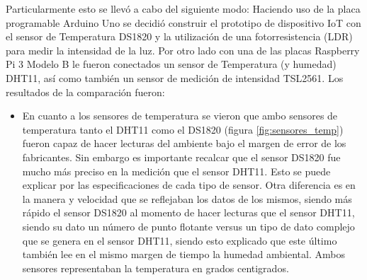 Particularmente esto se llevó a cabo del siguiente modo: Haciendo uso de la placa programable Arduino Uno se decidió construir el prototipo de dispositivo IoT con el sensor de Temperatura DS1820 y la utilización de una fotorresistencia (LDR) para medir la intensidad de la luz. Por otro lado con una de las placas Raspberry Pi 3 Modelo B le fueron conectados un sensor de Temperatura (y humedad) DHT11, así como también un sensor de medición de intensidad TSL2561. Los resultados de la comparación fueron: 
\begin{itemize}
\item En cuanto a los sensores de temperatura se vieron que ambo sensores de temperatura tanto el DHT11 como el DS1820 (figura \ref{fig:sensores_temp}) fueron capaz de hacer lecturas del ambiente bajo el margen de error de los fabricantes. Sin embargo es importante recalcar que el sensor DS1820 fue mucho más preciso en la medición que el sensor DHT11. Esto se puede explicar por las especificaciones de cada tipo de sensor. Otra diferencia es en la manera y velocidad que se reflejaban los datos de los mismos, siendo más rápido el sensor DS1820 al momento de hacer lecturas que el sensor DHT11, siendo su dato un número de punto flotante versus un tipo de dato complejo que se genera en el sensor DHT11, siendo esto explicado que este último también lee en el mismo margen de tiempo la humedad ambiental. Ambos sensores representaban la temperatura en grados centigrados.


\end{itemize}
